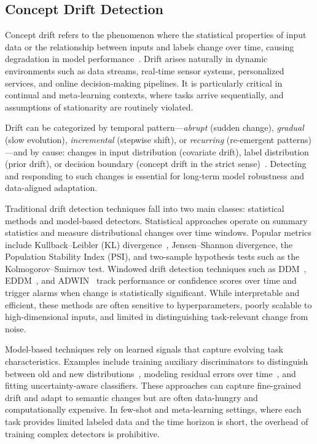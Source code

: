 \documentclass[conference]{IEEEtran}
\begin{document}
\subsection{Concept Drift Detection}

Concept drift refers to the phenomenon where the statistical properties of input data or the relationship between inputs and labels change over time, causing degradation in model performance~\cite{gama2014survey}. Drift arises naturally in dynamic environments such as data streams, real-time sensor systems, personalized services, and online decision-making pipelines. It is particularly critical in continual and meta-learning contexts, where tasks arrive sequentially, and assumptions of stationarity are routinely violated.

Drift can be categorized by temporal pattern—\emph{abrupt} (sudden change), \emph{gradual} (slow evolution), \emph{incremental} (stepwise shift), or \emph{recurring} (re-emergent patterns)—and by cause: changes in input distribution (covariate drift), label distribution (prior drift), or decision boundary (concept drift in the strict sense)~\cite{widmer1996learning}. Detecting and responding to such changes is essential for long-term model robustness and data-aligned adaptation.

Traditional drift detection techniques fall into two main classes: statistical methods and model-based detectors. Statistical approaches operate on summary statistics and measure distributional changes over time windows. Popular metrics include Kullback–Leibler (KL) divergence~\cite{klein2003hmm}, Jensen–Shannon divergence, the Population Stability Index (PSI), and two-sample hypothesis tests such as the Kolmogorov–Smirnov test. Windowed drift detection techniques such as DDM~\cite{gama2004learning}, EDDM~\cite{baena2006early}, and ADWIN~\cite{bifet2007learning} track performance or confidence scores over time and trigger alarms when change is statistically significant. While interpretable and efficient, these methods are often sensitive to hyperparameters, poorly scalable to high-dimensional inputs, and limited in distinguishing task-relevant change from noise.

Model-based techniques rely on learned signals that capture evolving task characteristics. Examples include training auxiliary discriminators to distinguish between old and new distributions~\cite{lu2018learning}, modeling residual errors over time~\cite{webb2016characterizing}, and fitting uncertainty-aware classifiers. These approaches can capture fine-grained drift and adapt to semantic changes but are often data-hungry and computationally expensive. In few-shot and meta-learning settings, where each task provides limited labeled data and the time horizon is short, the overhead of training complex detectors is prohibitive.
\end{document}
